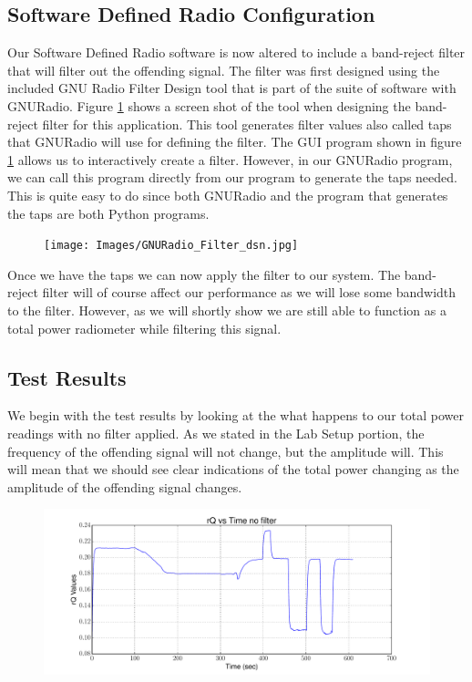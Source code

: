 \subsection{Software Defined Radio Configuration}
Our Software Defined Radio software is now altered to include a band-reject filter that will filter out the offending signal.  The filter was first designed using the included GNU Radio Filter Design tool that is part of the suite of software with GNURadio.  Figure \ref{GRC_Filter_DSN} shows a screen shot of the tool when designing the band-reject filter for this application.  This tool generates filter values also called taps that GNURadio will use for defining the filter.  The GUI program shown in figure \ref{GRC_Filter_DSN} allows us to interactively create a filter.  However, in our GNURadio program, we can call this program directly from our program to generate the taps needed.  This is quite easy to do since both GNURadio and the program that generates the taps are both Python programs.  

\begin{figure}[h!tb] \centering

\texttt{[image: Images/GNURadio\_Filter\_dsn.jpg]}
\label{GRC_Filter_DSN}
\end{figure}  

Once we have the taps we can now apply the filter to our system.  The band-reject filter will of course affect our performance as we will lose some bandwidth to the filter.  However, as we will shortly show we are still able to function as a total power radiometer while filtering this signal.  

\subsection{Test Results}
We begin with the test results by looking at the what happens to our total power readings with no filter applied.  As we stated in the Lab Setup portion, the frequency of the offending signal will not change, but the amplitude will.  This will mean that we should see clear indications of the total power changing as the amplitude of the offending signal changes.  

\begin{figure}[h!tb] \centering

\includegraphics[width=\textwidth]{Experiments/Exp4/sdr_raw_unfiltered.pdf}

\label{sdr_unfilt_raw}
\end{figure}


